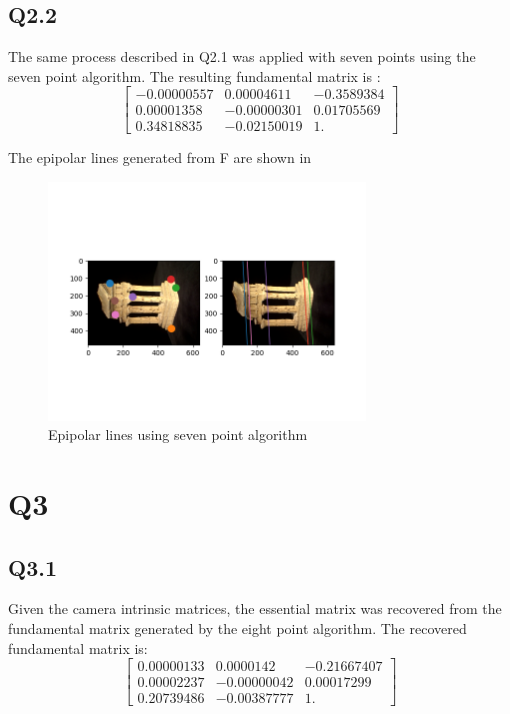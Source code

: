 \documentclass[12pt]{article}
\begin{document}
\newpage
\subsection{Q2.2}


The same process described in Q2.1 was applied with seven points using the seven point algorithm. The resulting fundamental matrix is :
$$
\begin{bmatrix}
-0.00000557  &  0.00004611  & -0.3589384 \\
0.00001358   & -0.00000301  &  0.01705569 \\
0.34818835   & -0.02150019  &  1.        
\end{bmatrix}
$$

The epipolar lines generated from F are shown in 

\begin{figure}[H]
\centering
\includegraphics[page=1,width=0.75\textwidth]{q2_2}
\caption{ Epipolar lines using seven point algorithm } 
\label{fig:fepipolar7}
\end{figure}   

\newpage
\section{Q3}
\subsection{Q3.1}
Given the camera intrinsic matrices, the essential matrix was recovered from the fundamental matrix generated by the eight point algorithm.
The recovered fundamental matrix is:
$$
\begin{bmatrix}
0.00000133 & 0.0000142   & -0.21667407 \\
0.00002237 & -0.00000042 &  0.00017299 \\
0.20739486 & -0.00387777 &  1.        
\end{bmatrix}
$$
\end{document}
